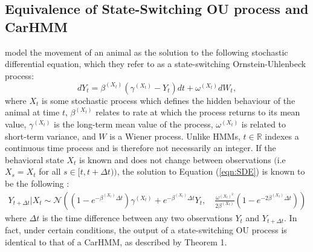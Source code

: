 
\subsection{Equivalence of State-Switching OU process and CarHMM}

\citet{Michelot:2019} model the movement of an animal as the solution to the following stochastic differential equation, which they refer to as a state-switching Ornstein-Uhlenbeck process:
%
\begin{equation}
    \label{eqn:SDE}
    dY_t = \beta^{(X_t)}(\gamma^{(X_t)} - Y_t)dt + \omega^{(X_t)} dW_t,
\end{equation}
%
where $X_t$ is some stochastic process which defines the hidden behaviour of the animal at time $t$, $\beta^{(X_t)}$ relates to rate at which the process returns to its mean value, $\gamma^{(X_t)}$ is the long-term mean value of the process, $\omega^{(X_t)}$ is related to short-term variance, and $W$ is a Wiener process. Unlike HMMs, $t \in \mathbb{R}$ indexes a continuous time process and is therefore not necessarily an integer. If the behavioral state $X_t$ is known and does not change between observations $\Big($i.e $X_s = X_t$ for all $s \in [t,t+\Delta t)\Big)$, the solution to Equation (\ref{eqn:SDE}) is known to be the following \citep{Michelot:2019}:
%
\begin{align}
    Y_{t+\Delta t} | X_{t} \sim \mathcal{N}\left((1-e^{-\beta^{(X_t)}\Delta t})\gamma^{(X_t)} + e^{-\beta^{(X_t)}\Delta t} Y_t,\quad \frac{\omega^{(X_t)^2}}{2\beta^{(X_t)}} (1-e^{-2\beta^{(X_t)}\Delta t})\right)
    \label{eqn:OU_sol}
\end{align}
%
where $\Delta t$ is the time difference between any two observations $Y_t$ and $Y_{t+\Delta t}$. In fact, under certain conditions, the output of a state-switching OU process is identical to that of a CarHMM, as described by Theorem 1.

